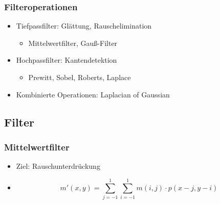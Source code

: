 \subsubsection*{Filteroperationen}

\begin{itemize}
\item Tiefpassfilter: Glättung, Rauschelimination
\begin{itemize}
	\item Mittelwertfilter, Gauß-Filter
\end{itemize}
\item Hochpassfilter: Kantendetektion
\begin{itemize}
	\item Prewitt, Sobel, Roberts, Laplace
\end{itemize}
\item Kombinierte Operationen: Laplacian of Gaussian
\end{itemize}

\subsection{Filter}

\subsubsection{Mittelwertfilter}
\begin{itemize}
  \item Ziel: Rauschunterdrückung
  \item $$m'(x,y) = \sum\limits_{j=-1}^1 \sum\limits_{i=-1}^1 m(i,j) \cdot p(x-j,y-i)$$
\end{itemize}

